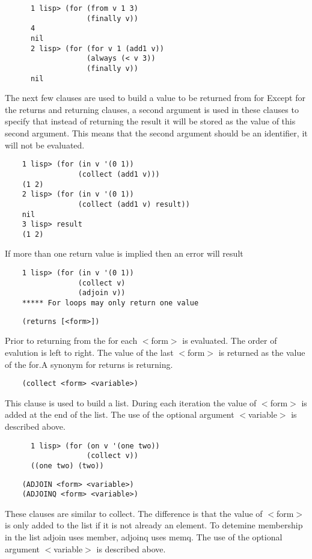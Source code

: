 \begin{verbatim}
      1 lisp> (for (from v 1 3)
                   (finally v))
      4
      nil
      2 lisp> (for (for v 1 (add1 v))
                   (always (< v 3))
                   (finally v))
      nil
\end{verbatim}

    The next few clauses  are  used  to  build  a  value  to  be
    returned  from  for  Except  for  the  returns and returning
    clauses, a second argument  is  used  in  these  clauses  to
    specify  that  instead  of  returning  the result it will be
    stored as the value of this second  argument.    This  means
    that  the  second  argument should be an identifier, it will
    not be evaluated.

\begin{verbatim}
    1 lisp> (for (in v '(0 1))
                 (collect (add1 v)))
    (1 2)
    2 lisp> (for (in v '(0 1))
                 (collect (add1 v) result))
    nil
    3 lisp> result
    (1 2)
\end{verbatim}
    If more than one return value is implied then an error  will
    result

\begin{verbatim}
    1 lisp> (for (in v '(0 1))
                 (collect v)
                 (adjoin v))
    ***** For loops may only return one value
\end{verbatim}
\begin{verbatim}
    (returns [<form>])
\end{verbatim}
      Prior to returning from the for each $<$form$>$ is evaluated.  The
      order of evalution is left to right.  The value of the last $<$form$>$
						is returned as the value of the for.A synonym for returns is
      returning.
      
\begin{verbatim}
    (collect <form> <variable>)
\end{verbatim}
      This clause is used to build a list.  During each iteration the value
      of $<$form$>$ is added at the end of the list. The use of the
						optional argument $<$variable$>$ is described above.
      
\begin{verbatim}
      1 lisp> (for (on v '(one two))
                   (collect v))
      ((one two) (two))
\end{verbatim}

\begin{verbatim}
    (ADJOIN <form> <variable>)
    (ADJOINQ <form> <variable>)
\end{verbatim}
      These clauses are similar to collect.  The difference is that the
      value of $<$form$>$ is only added to the list if it is not
						already an element. To detemine membership in the list adjoin
						uses member, adjoinq uses memq. The use of the optional
						argument $<$variable$>$ is described above.
                                         
